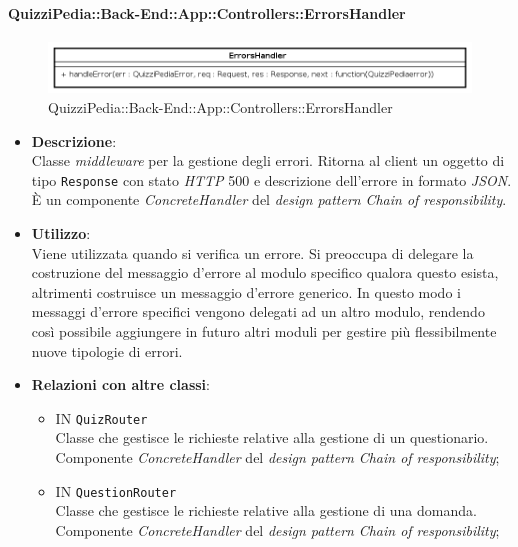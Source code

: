 \paragraph{QuizziPedia::Back-End::App::Controllers::ErrorsHandler}
\begin{figure}[ht]
	\centering
	\includegraphics[scale=0.45]{UML/Classi/Back-End/QuizziPedia_Back-End_App_Controllers_ErrorsHandler.png}
	\caption{QuizziPedia::Back-End::App::Controllers::ErrorsHandler}
\end{figure}
\FloatBarrier


\begin{itemize}
	\item \textbf{Descrizione}:\\
	Classe \textit{middleware} per la gestione degli errori. Ritorna al client un oggetto di tipo \texttt{Response} con stato \textit{HTTP} 500 e descrizione dell'errore in formato \textit{JSON}. È un componente \textit{ConcreteHandler} del \textit{design pattern} \textit{Chain of responsibility}.
	\item \textbf{Utilizzo}:\\
	Viene utilizzata quando si verifica un errore. Si preoccupa di delegare la costruzione del messaggio d'errore al modulo specifico qualora questo esista, altrimenti costruisce un messaggio d'errore generico. In questo modo i messaggi d'errore specifici vengono delegati ad un altro modulo, rendendo così possibile aggiungere in futuro altri moduli per gestire più flessibilmente nuove tipologie di errori.
	\item \textbf{Relazioni con altre classi}:\\
	\begin{itemize}
		\item IN \texttt{QuizRouter}\\
		Classe che gestisce le richieste relative alla gestione di un questionario. Componente \textit{ConcreteHandler} del \textit{design pattern} \textit{Chain of responsibility};
		\item IN \texttt{QuestionRouter}\\
		Classe che gestisce le richieste relative alla gestione di una domanda. Componente \textit{ConcreteHandler} del \textit{design pattern} \textit{Chain of responsibility};

\end{itemize}
\end{itemize}

